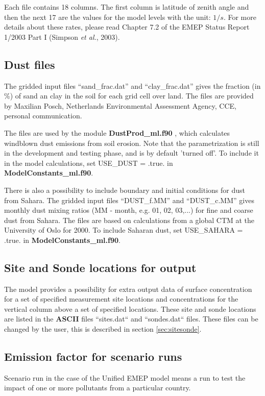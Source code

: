 Each file contains 18 columns. The first column is latitude of zenith 
angle and then the
next 17 are the values for the model levels with the unit: $1/s$. 
For more details about these rates, please read Chapter 7.2 of the EMEP
Status Report 1/2003 Part I (Simpson {\sl et al.}, 2003).

\subsection{Dust files}

The gridded input files ``sand\_frac.dat'' and ``clay\_frac.dat'' gives the fraction (in \%)  
of sand an clay in the soil for each grid cell over land. The files are provided by 
Maxilian Posch, Netherlands Environmental Assessment Agency, CCE, personal communication.

The files are used by the module {\bf DustProd\_ml.f90 }, which calculates windblown dust 
emissions from soil erosion. Note that the parametrization is still in the development and 
testing phase, and is by default 'turned off'. To include it in the model calculations, set 
USE\_DUST = .true. in {\bf ModelConstants\_ml.f90}.

There is also a possibility to include boundary and initial conditions for dust from Sahara. 
The gridded input files ``DUST\_f.MM'' and ``DUST\_c.MM'' gives monthly dust mixing 
ratios (MM - month, e.g. 01, 02, 03,...) for fine and coarse dust from Sahara. The files are based on calculations 
from a global CTM at the University of Oslo for 2000. 
To include Saharan dust, set USE\_SAHARA = .true. in {\bf ModelConstants\_ml.f90}.



\subsection{Site and Sonde locations for output}\label{sec:sitessondes_input}
The model provides a possibility for extra output data of surface concentration 
for a set of specified measurement site locations and concentrations for the vertical 
column above a set of specified locations. These site and sonde locations are listed 
in the {\bf ASCII} files ``sites.dat`` and ``sondes.dat`` files. These files can be 
changed by the user, this is described in section \ref{sec:sitesonde}.


\subsection{Emission factor for scenario runs}\label{sec:femis}
Scenario run in the case of the Unified EMEP model means a run to test
the impact of one or more pollutants from a particular
country. 


